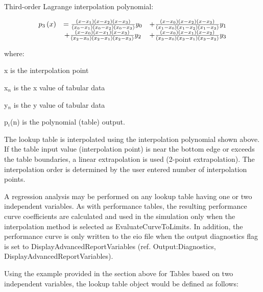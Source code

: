 Third-order Lagrange interpolation polynomial:

\begin{equation}
\begin{array}{ccc}
  p_3\left(x\right) &= \frac{\left(x-x_{1}\right)\left(x-x_{2}\right)\left(x-x_{3}\right)} {\left(x_{0}-x_{1}\right)\left(x_{0}-x_{2}\right)\left(x_{0}-x_{3}\right)} y_0
            &+ \frac{\left(x-x_{0}\right)\left(x-x_{2}\right)\left(x-x_{3}\right)} {\left(x_{1}-x_{0}\right)\left(x_{1}-x_{2}\right)\left(x_{1}-x_{3}\right)} y_1 \\
            &+ \frac{\left(x-x_{0}\right)\left(x-x_{1}\right)\left(x-x_{3}\right)} {\left(x_{2}-x_{0}\right)\left(x_{2}-x_{1}\right)\left(x_{2}-x_{3}\right)} y_2
            &+ \frac{\left(x-x_{0}\right)\left(x-x_{1}\right)\left(x-x_{2}\right)} {\left(x_{3}-x_{0}\right)\left(x_{3}-x_{1}\right)\left(x_{3}-x_{2}\right)} y_3
\end{array}
\end{equation}

where:

x is the interpolation point

x\(_{n}\) is the x value of tabular data

y\(_{n}\) is the y value of tabular data

p\(_{i}\)(n) is the polynomial (table) output.

The lookup table is interpolated using the interpolation polynomial shown above. If the table input value (interpolation point) is near the bottom edge or exceeds the table boundaries, a linear extrapolation is used (2-point extrapolation). The interpolation order is determined by the user entered number of interpolation points.

A regression analysis may be performed on any lookup table having one or two independent variables. As with performance tables, the resulting performance curve coefficients are calculated and used in the simulation only when the interpolation method is selected as EvaluateCurveToLimits. In addition, the performance curve is only written to the eio file when the output diagnostics flag is set to DisplayAdvancedReportVariables (ref. Output:Diagnostics, DisplayAdvancedReportVariables).

Using the example provided in the section above for Tables based on two independent variables, the lookup table object would be defined as follows:

